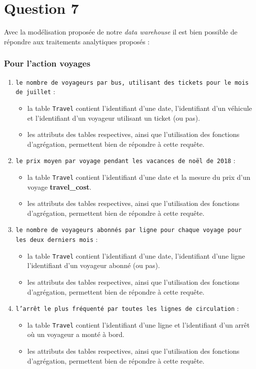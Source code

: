 \documentclass[a4paper,12pt]{report}
\begin{document}
\section*{Question 7}
\label{sec:question_7}
Avec la modélisation proposée de notre \textit{data warehouse} il est bien possible de répondre aux traitements analytiques proposés :

\subsubsection{Pour l'action \og voyages \fg}
\begin{enumerate}
  \item \texttt{le nombre de voyageurs par bus, utilisant des tickets pour le mois de juillet} :
  \begin{itemize}
    \item la table \texttt{Travel} contient l'identifiant d'une date, l'identifiant d'un véhicule et l'identifiant d'un voyageur utilisant un ticket (ou pas).
    \item les attributs des tables respectives, ainsi que l'utilisation des fonctions d'agrégation, permettent bien de répondre à cette requête.
  \end{itemize}
  \item \texttt{le prix moyen par voyage pendant les vacances de noël de 2018} :
  \begin{itemize}
    \item la table \texttt{Travel} contient l'identifiant d'une date et la mesure du prix d'un voyage \textbf{travel\_cost}.
    \item les attributs des tables respectives, ainsi que l'utilisation des fonctions d'agrégation, permettent bien de répondre à cette requête.
  \end{itemize}
  \item \texttt{le nombre de voyageurs abonnés par ligne pour chaque voyage pour les deux derniers mois} :
  \begin{itemize}
    \item la table \texttt{Travel} contient l'identifiant d'une date, l'identifiant d'une ligne l'identifiant d'un voyageur abonné (ou pas).
    \item les attributs des tables respectives, ainsi que l'utilisation des fonctions d'agrégation, permettent bien de répondre à cette requête.
  \end{itemize}
  \item \texttt{l'arrêt le plus fréquenté par toutes les lignes de circulation} :
  \begin{itemize}
    \item la table \texttt{Travel} contient l'identifiant d'une ligne et l'identifiant d'un arrêt où un voyageur a monté à bord.
    \item les attributs des tables respectives, ainsi que l'utilisation des fonctions d'agrégation, permettent bien de répondre à cette requête.
  \end{itemize}
\end{enumerate}
\end{document}
